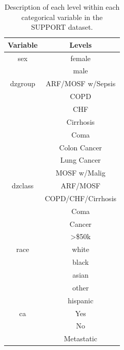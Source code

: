 \documentclass[
]{jss}
\begin{document}
\begin{table}[ht]
\centering
\begin{tabular}{cc}
\hline
\textbf{Variable} & \textbf{Levels}                      \\
\hline
sex      & female                                        \\
         & male                                          \\
dzgroup  & ARF/MOSF w/Sepsis                             \\
         & COPD                                          \\
         & CHF                                           \\
         & Cirrhosis                                     \\
         & Coma                                          \\
         & Colon Cancer                                  \\
         & Lung Cancer                                   \\
         & MOSF w/Malig                                  \\
dzclass  & ARF/MOSF                                      \\
         & COPD/CHF/Cirrhosis                            \\
         & Coma                                          \\
         & Cancer                                        \\
         & \textgreater{}\$50k                           \\
race     & white                                         \\
         & black                                         \\
         & asian                                         \\
         & other                                         \\
         & hispanic                                      \\
ca       & Yes                                           \\
         & No                                            \\
         & Metastatic                                    \\
\end{tabular}
\caption{Description of each level within each categorical variable in the SUPPORT dataset.}
\label{tab:support2}
\end{table}
\end{document}
